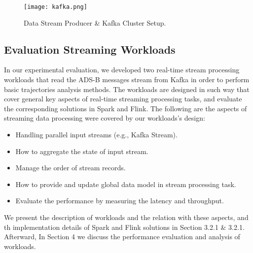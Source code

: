 \documentclass[]{article}
\begin{document}
\begin{figure}[h]
 
  \centering
    \texttt{[image: kafka.png]}
     \caption{Data Stream Producer \& Kafka Cluster Setup.}
\end{figure} 

\subsection{Evaluation Streaming Workloads}
In our experimental evaluation, we developed two real-time stream processing workloads that read the ADS-B messages stream from Kafka in order to perform basic trajectories analysis methods. The workloads are designed in such way that cover general key aspects of real-time streaming processing tasks, and evaluate the corresponding solutions in Spark and Flink. The following are the aspects of streaming data processing were covered by our workloads's design: 

\begin{itemize}
\item Handling parallel input streams (e.g., Kafka Stream).
\item How to aggregate the state of input stream.
\item Manage the order of stream records.
\item How to provide and update global data model in stream processing task.
\item Evaluate the performance by measuring  the latency and throughput.
\end{itemize}
We present the description of workloads and the relation with these aspects, and th implementation details of Spark and Flink solutions in Section 3.2.1 \& 3.2.1. Afterward, In Section 4 we discuss the performance evaluation and analysis of workloads.
\end{document}
